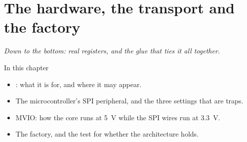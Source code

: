 \chapter{The hardware, the transport and the factory}
\label{ch:avr}


{\large\itshape Down to the bottom: real registers, and the glue that ties it all together.\par}

\begin{chapterbox}{In this chapter}
\begin{itemize}
  \item {}: what it is for, and where it may appear.
  \item The microcontroller's SPI peripheral, and the three settings that are traps.
  \item MVIO: how the core runs at 5~V while the SPI wires run at 3.3~V.
  \item The factory, and the test for whether the architecture holds.
\end{itemize}
\end{chapterbox}






